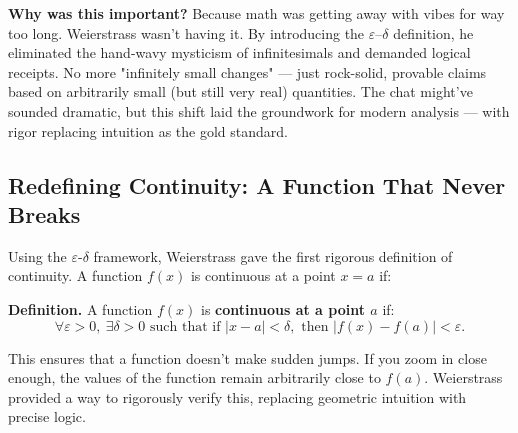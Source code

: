 \textbf{Why was this important?} Because math was getting away with vibes for way too long. Weierstrass wasn’t having it. By introducing the $\varepsilon$–$\delta$ definition, he eliminated the hand-wavy mysticism of infinitesimals and demanded logical receipts. No more "infinitely small changes" — just rock-solid, provable claims based on arbitrarily small (but still very real) quantities. The chat might’ve sounded dramatic, but this shift laid the groundwork for modern analysis — with rigor replacing intuition as the gold standard.


\subsection{Redefining Continuity: A Function That Never Breaks}

Using the \(\varepsilon\)-\(\delta\) framework, Weierstrass gave the first rigorous definition of continuity. A function \( f(x) \) is continuous at a point \( x = a \) if:

\vspace{0.5em}
\noindent\textbf{Definition.}
A function \( f(x) \) is \textbf{continuous at a point \( a \)} if:
\[
\forall \varepsilon > 0,\ \exists \delta > 0 \text{ such that if } |x - a| < \delta, \text{ then } |f(x) - f(a)| < \varepsilon.
\]
\vspace{1em}

This ensures that a function doesn't make sudden jumps. If you zoom in close enough, the values of the function remain arbitrarily close to \( f(a) \). Weierstrass provided a way to rigorously verify this, replacing geometric intuition with precise logic.

